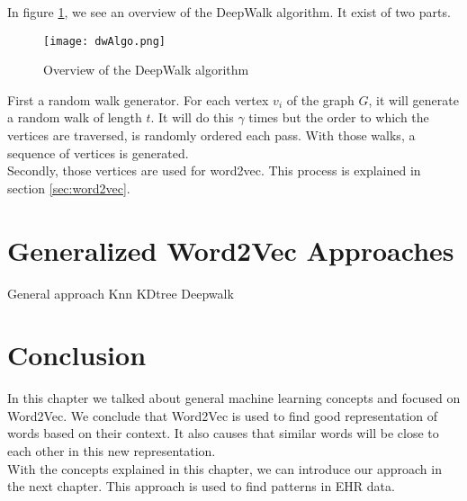In figure \ref{fig:dwAlgo}, we see an overview of the DeepWalk algorithm. It exist of two parts. 

\begin{figure}[H]
	\centering
	\texttt{[image: dwAlgo.png]}
	\caption{Overview of the DeepWalk algorithm \cite{deepwalkMain:article}}
	\label{fig:dwAlgo}
\end{figure} 

First a random walk generator. For each vertex $v_i$ of the graph $G$, it will generate a random walk of length $t$. It will do this $\gamma$ times but the order to which the vertices are traversed, is randomly ordered each pass. With those walks, a sequence of vertices is generated. \\
Secondly, those vertices are used for word2vec. This process is explained in section \ref{sec:word2vec}.


\section{Generalized Word2Vec Approaches}
\label{sec:gw2v}


General approach 
Knn
KDtree
Deepwalk


\section{Conclusion}
In this chapter we talked about general machine learning concepts and focused on Word2Vec. We conclude that Word2Vec is used to find good representation of words based on their context. It also causes that similar words will be close to each other in this new representation. \\

With the concepts explained in this chapter, we can introduce our approach in the next chapter. This approach is used to find patterns in EHR data.




